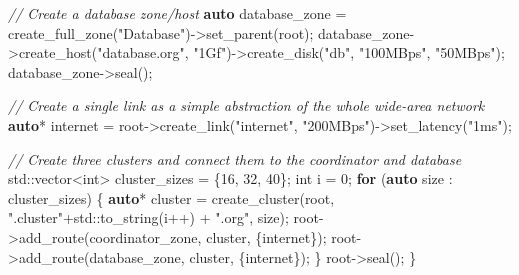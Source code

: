 \documentclass[
]{article}
\newenvironment{Shaded}{}{}
\newcommand{\BuiltInTok}[1]{\textcolor[rgb]{0.00,0.50,0.00}{#1}}
\newcommand{\CommentTok}[1]{\textcolor[rgb]{0.38,0.63,0.69}{\textit{#1}}}
\newcommand{\ControlFlowTok}[1]{\textcolor[rgb]{0.00,0.44,0.13}{\textbf{#1}}}
\newcommand{\DataTypeTok}[1]{\textcolor[rgb]{0.56,0.13,0.00}{#1}}
\newcommand{\DecValTok}[1]{\textcolor[rgb]{0.25,0.63,0.44}{#1}}
\newcommand{\KeywordTok}[1]{\textcolor[rgb]{0.00,0.44,0.13}{\textbf{#1}}}
\newcommand{\NormalTok}[1]{#1}
\newcommand{\OperatorTok}[1]{\textcolor[rgb]{0.40,0.40,0.40}{#1}}
\newcommand{\StringTok}[1]{\textcolor[rgb]{0.25,0.44,0.63}{#1}}
\begin{document}
\begin{Shaded}
\begin{Highlighting}[]
    \CommentTok{// Create a database zone/host}
    \KeywordTok{auto}\NormalTok{ database\_zone }\OperatorTok{=}\NormalTok{ create\_full\_zone}\OperatorTok{(}\StringTok{"Database"}\OperatorTok{){-}\textgreater{}}\NormalTok{set\_parent}\OperatorTok{(}\NormalTok{root}\OperatorTok{);}
\NormalTok{    database\_zone}\OperatorTok{{-}\textgreater{}}\NormalTok{create\_host}\OperatorTok{(}\StringTok{"database.org"}\OperatorTok{,} \StringTok{"1Gf"}\OperatorTok{){-}\textgreater{}}\NormalTok{create\_disk}\OperatorTok{(}\StringTok{"db"}\OperatorTok{,} \StringTok{"100MBps"}\OperatorTok{,} \StringTok{"50MBps"}\OperatorTok{);}
\NormalTok{    database\_zone}\OperatorTok{{-}\textgreater{}}\NormalTok{seal}\OperatorTok{();}

    \CommentTok{// Create a single link as a simple abstraction of the whole wide{-}area network}
    \KeywordTok{auto}\OperatorTok{*}\NormalTok{ internet }\OperatorTok{=}\NormalTok{ root}\OperatorTok{{-}\textgreater{}}\NormalTok{create\_link}\OperatorTok{(}\StringTok{"internet"}\OperatorTok{,} \StringTok{"200MBps"}\OperatorTok{){-}\textgreater{}}\NormalTok{set\_latency}\OperatorTok{(}\StringTok{"1ms"}\OperatorTok{);}

    \CommentTok{// Create three clusters and connect them to the coordinator and database}
    \BuiltInTok{std::}\NormalTok{vector}\OperatorTok{\textless{}}\DataTypeTok{int}\OperatorTok{\textgreater{}}\NormalTok{ cluster\_sizes }\OperatorTok{=} \OperatorTok{\{}\DecValTok{16}\OperatorTok{,} \DecValTok{32}\OperatorTok{,} \DecValTok{40}\OperatorTok{\};}
    \DataTypeTok{int}\NormalTok{ i }\OperatorTok{=} \DecValTok{0}\OperatorTok{;}
    \ControlFlowTok{for} \OperatorTok{(}\KeywordTok{auto}\NormalTok{ size }\OperatorTok{:}\NormalTok{ cluster\_sizes}\OperatorTok{)} \OperatorTok{\{}
    \KeywordTok{auto}\OperatorTok{*}\NormalTok{ cluster }\OperatorTok{=}\NormalTok{ create\_cluster}\OperatorTok{(}\NormalTok{root}\OperatorTok{,} \StringTok{".cluster"}\OperatorTok{+}\BuiltInTok{std::}\NormalTok{to\_string}\OperatorTok{(}\NormalTok{i}\OperatorTok{++)} \OperatorTok{+} \StringTok{".org"}\OperatorTok{,}\NormalTok{ size}\OperatorTok{);}
\NormalTok{    root}\OperatorTok{{-}\textgreater{}}\NormalTok{add\_route}\OperatorTok{(}\NormalTok{coordinator\_zone}\OperatorTok{,}\NormalTok{ cluster}\OperatorTok{,} \OperatorTok{\{}\NormalTok{internet}\OperatorTok{\});}
\NormalTok{    root}\OperatorTok{{-}\textgreater{}}\NormalTok{add\_route}\OperatorTok{(}\NormalTok{database\_zone}\OperatorTok{,}\NormalTok{ cluster}\OperatorTok{,} \OperatorTok{\{}\NormalTok{internet}\OperatorTok{\});}
    \OperatorTok{\}}
\NormalTok{    root}\OperatorTok{{-}\textgreater{}}\NormalTok{seal}\OperatorTok{();}
\OperatorTok{\}} 
\end{Highlighting}
\end{Shaded}
\end{document}
